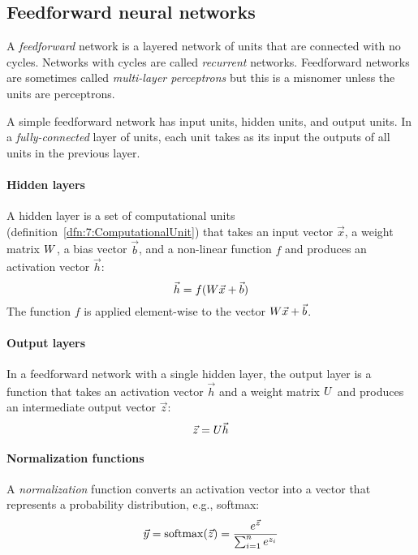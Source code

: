 \subsection{Feedforward neural networks}

A \textit{feedforward} network is a layered network of units that are connected
with no cycles.
Networks with cycles are called \textit{recurrent} networks.
Feedforward networks are sometimes called \textit{multi-layer perceptrons} but
this is a misnomer unless the units are perceptrons.

A simple feedforward network has input units, hidden units, and output units.
In a \textit{fully-connected} layer of units, each unit takes as its input the
outputs of all units in the previous layer.

\paragraph{Hidden layers}

A hidden layer is a set of computational units
(definition~\ref{dfn:7:ComputationalUnit}) that takes an input vector
$\vec{x}$, a weight matrix $W$, a bias vector $\vec{b}$, and a
non-linear function $f$ and produces an activation vector $\vec{h}$:
\begin{equation}
  \vec{h} = f(W \vec{x} + \vec{b})
\end{equation}
The function $f$ is applied element-wise to the vector
$W \vec{x} + \vec{b}$.

\paragraph{Output layers}

In a feedforward network with a single hidden layer, the output layer is a
function that takes an activation vector $\vec{h}$ and a weight matrix
$U$ and produces an intermediate output vector $\vec{z}$:
\begin{equation}
  \vec{z} = U \vec{h}
\end{equation}

\paragraph{Normalization functions}

A \textit{normalization} function converts an activation vector into a vector
that represents a probability distribution, e.g., softmax:
\begin{equation}
  \vec{y} = \operatorname{softmax}(\vec{z}) = \frac{e^{\vec{z}}}{\sum_{i = 1}^{n} e^{z_i}}
\end{equation}

